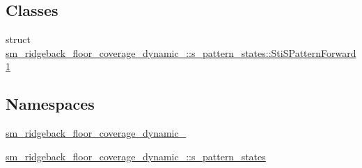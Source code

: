 \subsection*{Classes}
\begin{DoxyCompactItemize}
\item 
struct \hyperlink{structsm__ridgeback__floor__coverage__dynamic__1_1_1s__pattern__states_1_1StiSPatternForward1}{sm\+\_\+ridgeback\+\_\+floor\+\_\+coverage\+\_\+dynamic\+\_\+::s\+\_\+pattern\+\_\+states\+::\+Sti\+S\+Pattern\+Forward1}
\end{DoxyCompactItemize}
\subsection*{Namespaces}
\begin{DoxyCompactItemize}
\item 
 \hyperlink{namespacesm__ridgeback__floor__coverage__dynamic__1}{sm\+\_\+ridgeback\+\_\+floor\+\_\+coverage\+\_\+dynamic\+\_}
\item 
 \hyperlink{namespacesm__ridgeback__floor__coverage__dynamic__1_1_1s__pattern__states}{sm\+\_\+ridgeback\+\_\+floor\+\_\+coverage\+\_\+dynamic\+\_\+::s\+\_\+pattern\+\_\+states}
\end{DoxyCompactItemize}
